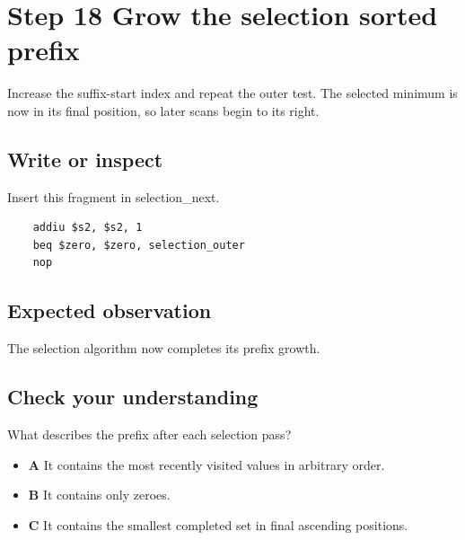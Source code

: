 \section{Step 18 Grow the selection sorted
  prefix}\label{009-sorting-visualizer-s18-step-18-grow-the-selection-sorted-prefix}

Increase the suffix-start index and repeat the outer test. The selected
minimum is now in its final position, so later scans begin to its right.

\subsection{Write or
  inspect}\label{009-sorting-visualizer-s18-write-or-inspect}

Insert this fragment in selection\_next.

\begin{verbatim}
    addiu $s2, $s2, 1
    beq $zero, $zero, selection_outer
    nop
\end{verbatim}

\subsection{Expected
  observation}\label{009-sorting-visualizer-s18-expected-observation}

The selection algorithm now completes its prefix growth.

\subsection{Check your
  understanding}\label{009-sorting-visualizer-s18-check-your-understanding}

What describes the prefix after each selection pass?

\begin{itemize}
  \tightlist
  \item
        \textbf{A} It contains the most recently visited values in arbitrary
        order.
  \item
        \textbf{B} It contains only zeroes.
  \item
        \textbf{C} It contains the smallest completed set in final ascending
        positions.
\end{itemize}
